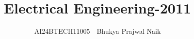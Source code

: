 \documentclass[journal]{IEEEtran}
\begin{document}

\vspace{3cm}

\title{Electrical Engineering-2011}
\author{AI24BTECH11005 - Bhukya Prajwal Naik
}
{\let\newpage\relax\maketitle}

\renewcommand{\thefigure}{\theenumi}
\renewcommand{\thetable}{\theenumi}
\setlength{\intextsep}{10pt} %


\renewcommand{\thetable}{\theenumi}
\end{document}
